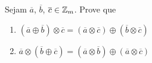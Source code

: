 \documentclass[12pt]{exam}
\begin{document}
    \vspace{.3cm}

    \questao{} Sejam $\overline{a}$, $\overline{b}$, $\overline{c} \in \mathbb{Z}_m$. Prove que
    \begin{enumerate}[label=({\alph*})]
        \item $(\overline{a} \oplus \overline{b}) \otimes \overline{c} = (\overline{a} \otimes \overline{c}) \oplus (\overline{b} \otimes \overline{c})$

        \item $\overline{a} \otimes (\overline{b} \oplus \overline{c}) = (\overline{a} \otimes \overline{b}) \oplus (\overline{a} \otimes \overline{c})$
    \end{enumerate}
\end{document}
